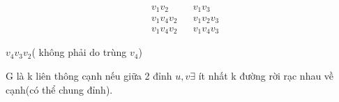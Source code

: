 \documentclass[12pt,oneside]{book}
\begin{document}
\begin{align*}
    &v_1v_2 && v_1v_3\\
    &v_1v_4v_2 && v_1v_2v_3\\
    &v_1v_4v_2 && v_1v_4v_3
\end{align*}

$v_4v_3v_2$( không phải do trùng $v_4$)
\begin{tcolorbox}[title=Đồ thị k liên thông cạnh (K - edge connected)]
G là k liên thông cạnh nếu giữa 2 đỉnh $u, v \exists$ ít nhất k đường rời rạc nhau về cạnh(có thể chung đỉnh).
\end{tcolorbox}
\begin{center}
    


\begin{tikzpicture}[x=0.75pt,y=0.75pt,yscale=-1,xscale=1]


\end{tikzpicture}
\end{center}
\end{document}
